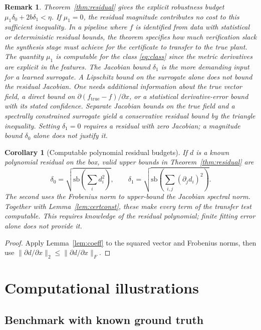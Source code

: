 \documentclass[12pt,onecolumn,journal]{IEEEtran}
\newtheorem{corollary}{Corollary}
\newtheorem{remark}{Remark}
\begin{document}
\begin{remark}
Theorem~\ref{thm:residual} gives the explicit robustness budget $\mu_1\delta_0+2b\delta_1<\eta$. If $\mu_1=0$, the residual magnitude contributes no cost to this sufficient inequality. In a pipeline where $f$ is identified from data with statistical or deterministic residual bounds, the theorem specifies how much verification slack the synthesis stage must achieve for the certificate to transfer to the true plant. The quantity $\mu_1$ is computable for the class \eqref{eq:class} since the metric derivatives are explicit in the features. The Jacobian bound $\delta_1$ is the more demanding input for a learned surrogate. A Lipschitz bound on the surrogate alone does not bound the residual Jacobian. One needs additional information about the true vector field, a direct bound on $\partial(f_{\mathrm{true}}-f)/\partial x$, or a statistical derivative-error bound with its stated confidence. Separate Jacobian bounds on the true field and a spectrally constrained surrogate yield a conservative residual bound by the triangle inequality. Setting $\delta_1 = 0$ requires a residual with zero Jacobian; a magnitude bound $\delta_0$ alone does not justify it.
\end{remark}

\begin{corollary}[Computable polynomial residual budgets]
\label{cor:polyresidual}
If $d$ is a known polynomial residual on the box, valid upper bounds in Theorem~\ref{thm:residual} are
\[
\delta_0=\sqrt{\mathrm{sb}\!\left(\sum_i d_i^2\right)},
\qquad
\delta_1=\sqrt{\mathrm{sb}\!\left(\sum_{i,j}(\partial_jd_i)^2\right)}.
\]
The second uses the Frobenius norm to upper-bound the Jacobian spectral norm. Together with Lemma~\ref{lem:certconst}, these make every term of the transfer test computable. This requires knowledge of the residual polynomial; finite fitting error alone does not provide it.
\end{corollary}

\begin{proof}
Apply Lemma~\ref{lem:coeff} to the squared vector and Frobenius norms, then use $\|\partial d/\partial x\|_2\le\|\partial d/\partial x\|_F$.
\end{proof}

\section{Computational illustrations}
\label{sec:experiments}

\subsection{Benchmark with known ground truth}
\label{sec:polynomialbenchmark}
\end{document}
